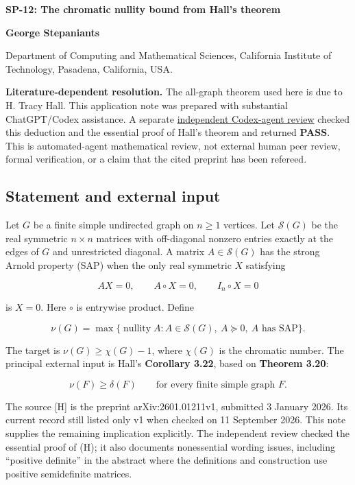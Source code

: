 \documentclass[10pt,a4paper]{article}
\begin{document}
{\raggedright\Large\bfseries SP-12: The chromatic nullity bound from
Hall's theorem\par}
\vspace{0.4em}
{\normalsize\bfseries George Stepaniants\par}
{\small Department of Computing and Mathematical Sciences, California
Institute of Technology, Pasadena, California, USA.\par}
\vspace{0.6em}
\pagestyle{plain}

\textbf{Literature-dependent resolution.} The all-graph theorem used
here is due to H. Tracy Hall. This application note was prepared with
substantial ChatGPT/Codex assistance. A separate
\href{https://github.com/ajt60gaibb/OpenProblemsInNLA/blob/main/references/stepaniants-sp11-sp12-2026-09-11/verification/SP-11-SP-12-independent-review.md}{independent
Codex-agent review} checked this deduction and the essential proof of
Hall's theorem and returned \textbf{PASS}. This is automated-agent
mathematical review, not external human peer review, formal
verification, or a claim that the cited preprint has been refereed.

\subsection{Statement and external
input}\label{statement-and-external-input}

Let \(G\) be a finite simple undirected graph on \(n\ge1\) vertices. Let
\(\mathcal S(G)\) be the real symmetric \(n\times n\) matrices with
off-diagonal nonzero entries exactly at the edges of \(G\) and
unrestricted diagonal. A matrix \(A\in\mathcal S(G)\) has the strong
Arnold property (SAP) when the only real symmetric \(X\) satisfying

\[
AX=0,\qquad A\circ X=0,\qquad I_n\circ X=0
\]

is \(X=0\). Here \(\circ\) is entrywise product. Define

\[
\nu(G)=\max\{\operatorname{nullity}A:
A\in\mathcal S(G),\ A\succeq0,\ A\text{ has SAP}\}.
\]

The target is \(\nu(G)\ge\chi(G)-1\), where \(\chi(G)\) is the chromatic
number. The principal external input is Hall's \textbf{Corollary 3.22},
based on \textbf{Theorem 3.20}:

\[\nu(F)\ge\delta(F)\qquad\text{for every finite simple graph }F.\tag{H}\]

The source {[}H{]} is the preprint arXiv:2601.01211v1, submitted 3
January 2026. Its current record still listed only v1 when checked on 11
September 2026. This note supplies the remaining implication explicitly.
The independent review checked the essential proof of (H); it also
documents nonessential wording issues, including ``positive definite''
in the abstract where the definitions and construction use positive
semidefinite matrices.
\end{document}
